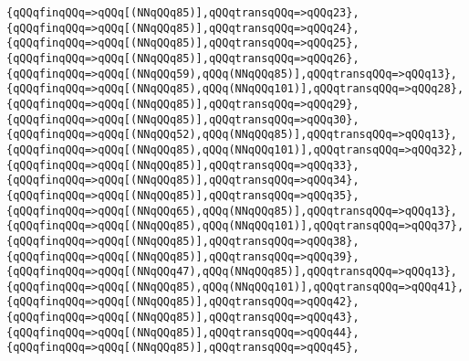 \verb|{qQQqfinqQQq=>qQQq[(NNqQQq85)],qQQqtransqQQq=>qQQq23},|\newline
\verb|{qQQqfinqQQq=>qQQq[(NNqQQq85)],qQQqtransqQQq=>qQQq24},|\newline
\verb|{qQQqfinqQQq=>qQQq[(NNqQQq85)],qQQqtransqQQq=>qQQq25},|\newline
\verb|{qQQqfinqQQq=>qQQq[(NNqQQq85)],qQQqtransqQQq=>qQQq26},|\newline
\verb|{qQQqfinqQQq=>qQQq[(NNqQQq59),qQQq(NNqQQq85)],qQQqtransqQQq=>qQQq13},|\newline
\verb|{qQQqfinqQQq=>qQQq[(NNqQQq85),qQQq(NNqQQq101)],qQQqtransqQQq=>qQQq28},|\newline
\verb|{qQQqfinqQQq=>qQQq[(NNqQQq85)],qQQqtransqQQq=>qQQq29},|\newline
\verb|{qQQqfinqQQq=>qQQq[(NNqQQq85)],qQQqtransqQQq=>qQQq30},|\newline
\verb|{qQQqfinqQQq=>qQQq[(NNqQQq52),qQQq(NNqQQq85)],qQQqtransqQQq=>qQQq13},|\newline
\verb|{qQQqfinqQQq=>qQQq[(NNqQQq85),qQQq(NNqQQq101)],qQQqtransqQQq=>qQQq32},|\newline
\verb|{qQQqfinqQQq=>qQQq[(NNqQQq85)],qQQqtransqQQq=>qQQq33},|\newline
\verb|{qQQqfinqQQq=>qQQq[(NNqQQq85)],qQQqtransqQQq=>qQQq34},|\newline
\verb|{qQQqfinqQQq=>qQQq[(NNqQQq85)],qQQqtransqQQq=>qQQq35},|\newline
\verb|{qQQqfinqQQq=>qQQq[(NNqQQq65),qQQq(NNqQQq85)],qQQqtransqQQq=>qQQq13},|\newline
\verb|{qQQqfinqQQq=>qQQq[(NNqQQq85),qQQq(NNqQQq101)],qQQqtransqQQq=>qQQq37},|\newline
\verb|{qQQqfinqQQq=>qQQq[(NNqQQq85)],qQQqtransqQQq=>qQQq38},|\newline
\verb|{qQQqfinqQQq=>qQQq[(NNqQQq85)],qQQqtransqQQq=>qQQq39},|\newline
\verb|{qQQqfinqQQq=>qQQq[(NNqQQq47),qQQq(NNqQQq85)],qQQqtransqQQq=>qQQq13},|\newline
\verb|{qQQqfinqQQq=>qQQq[(NNqQQq85),qQQq(NNqQQq101)],qQQqtransqQQq=>qQQq41},|\newline
\verb|{qQQqfinqQQq=>qQQq[(NNqQQq85)],qQQqtransqQQq=>qQQq42},|\newline
\verb|{qQQqfinqQQq=>qQQq[(NNqQQq85)],qQQqtransqQQq=>qQQq43},|\newline
\verb|{qQQqfinqQQq=>qQQq[(NNqQQq85)],qQQqtransqQQq=>qQQq44},|\newline
\verb|{qQQqfinqQQq=>qQQq[(NNqQQq85)],qQQqtransqQQq=>qQQq45},|\newline
